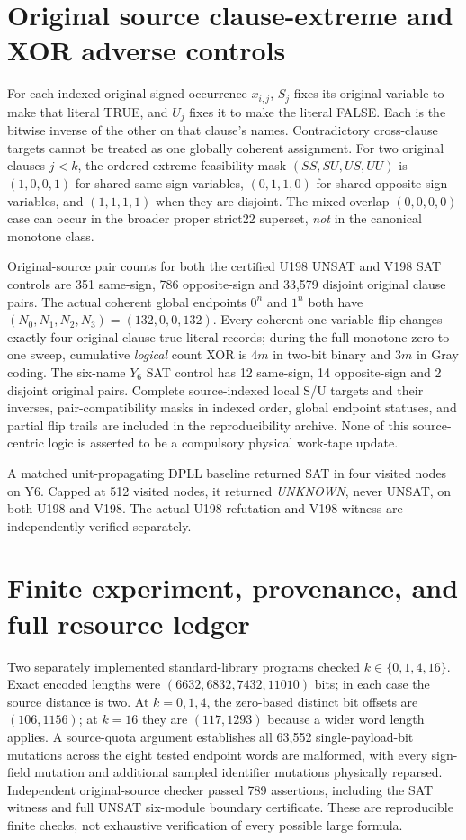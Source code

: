 \documentclass[11pt]{article}
\begin{document}
\section{Original source clause-extreme and XOR adverse controls}
For each indexed original signed occurrence $x_{i,j}$, $S_j$ fixes its original variable to make that literal TRUE, and $U_j$ fixes it to make the literal FALSE. Each is the bitwise inverse of the other on that clause's names. Contradictory cross-clause targets cannot be treated as one globally coherent assignment. For two original clauses $j<k$, the ordered extreme feasibility mask $(SS,SU,US,UU)$ is $(1,0,0,1)$ for shared same-sign variables, $(0,1,1,0)$ for shared opposite-sign variables, and $(1,1,1,1)$ when they are disjoint. The mixed-overlap $(0,0,0,0)$ case can occur in the broader proper strict22 superset, \emph{not} in the canonical monotone class.

Original-source pair counts for both the certified U198 UNSAT and V198 SAT controls are 351 same-sign, 786 opposite-sign and 33,579 disjoint original clause pairs. The actual coherent global endpoints $0^n$ and $1^n$ both have $(N_0,N_1,N_2,N_3)=(132,0,0,132)$. Every coherent one-variable flip changes exactly four original clause true-literal records; during the full monotone zero-to-one sweep, cumulative \emph{logical} count XOR is $4m$ in two-bit binary and $3m$ in Gray coding. The six-name $Y_6$ SAT control has 12 same-sign, 14 opposite-sign and 2 disjoint original pairs. Complete source-indexed local S/U targets and their inverses, pair-compatibility masks in indexed order, global endpoint statuses, and partial flip trails are included in the reproducibility archive. None of this source-centric logic is asserted to be a compulsory physical work-tape update.

A matched unit-propagating DPLL baseline returned SAT in four visited nodes on Y6. Capped at 512 visited nodes, it returned \emph{UNKNOWN}, never UNSAT, on both U198 and V198. The actual U198 refutation and V198 witness are independently verified separately.

\section{Finite experiment, provenance, and full resource ledger}
Two separately implemented standard-library programs checked $k\in\{0,1,4,16\}$. Exact encoded lengths were $(6632,6832,7432,11010)$ bits; in each case the source distance is two. At $k=0,1,4$, the zero-based distinct bit offsets are $(106,1156)$; at $k=16$ they are $(117,1293)$ because a wider word length applies. A source-quota argument establishes all 63,552 single-payload-bit mutations across the eight tested endpoint words are malformed, with every sign-field mutation and additional sampled identifier mutations physically reparsed. Independent original-source checker passed 789 assertions, including the SAT witness and full UNSAT six-module boundary certificate. These are reproducible finite checks, not exhaustive verification of every possible large formula.
\end{document}
